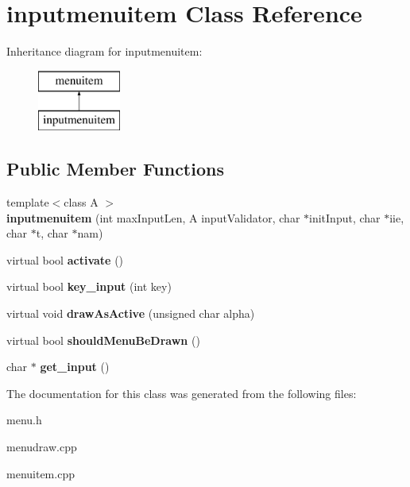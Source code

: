 \hypertarget{classinputmenuitem}{\section{inputmenuitem Class Reference}
\label{classinputmenuitem}
}
Inheritance diagram for inputmenuitem\-:\begin{figure}[H]
\begin{center}
\leavevmode
\includegraphics[height=2.000000cm]{classinputmenuitem}
\end{center}
\end{figure}
\subsection*{Public Member Functions}
\begin{DoxyCompactItemize}
\item 
\hypertarget{classinputmenuitem_a98392bce22539a262660d9af8ac54dc1}{{\footnotesize template$<$class A $>$ }\\{\bfseries inputmenuitem} (int max\-Input\-Len, A input\-Validator, char $\ast$init\-Input, char $\ast$iie, char $\ast$t, char $\ast$nam)}\label{classinputmenuitem_a98392bce22539a262660d9af8ac54dc1}

\item 
\hypertarget{classinputmenuitem_a04a64f8773fd62f74ff83005131221ef}{virtual bool {\bfseries activate} ()}\label{classinputmenuitem_a04a64f8773fd62f74ff83005131221ef}

\item 
\hypertarget{classinputmenuitem_a4cf096ba35175b1449f0e520b782c962}{virtual bool {\bfseries key\-\_\-input} (int key)}\label{classinputmenuitem_a4cf096ba35175b1449f0e520b782c962}

\item 
\hypertarget{classinputmenuitem_a51cbcdd67c8b4b1141f5fef1ac6674b1}{virtual void {\bfseries draw\-As\-Active} (unsigned char alpha)}\label{classinputmenuitem_a51cbcdd67c8b4b1141f5fef1ac6674b1}

\item 
\hypertarget{classinputmenuitem_a6761537bcc892dbcc772e45da3c7626d}{virtual bool {\bfseries should\-Menu\-Be\-Drawn} ()}\label{classinputmenuitem_a6761537bcc892dbcc772e45da3c7626d}

\item 
\hypertarget{classinputmenuitem_a272f77ba61bb730ca7e171e7ac148c50}{char $\ast$ {\bfseries get\-\_\-input} ()}\label{classinputmenuitem_a272f77ba61bb730ca7e171e7ac148c50}

\end{DoxyCompactItemize}


The documentation for this class was generated from the following files\-:\begin{DoxyCompactItemize}
\item 
menu.\-h\item 
menudraw.\-cpp\item 
menuitem.\-cpp\end{DoxyCompactItemize}
